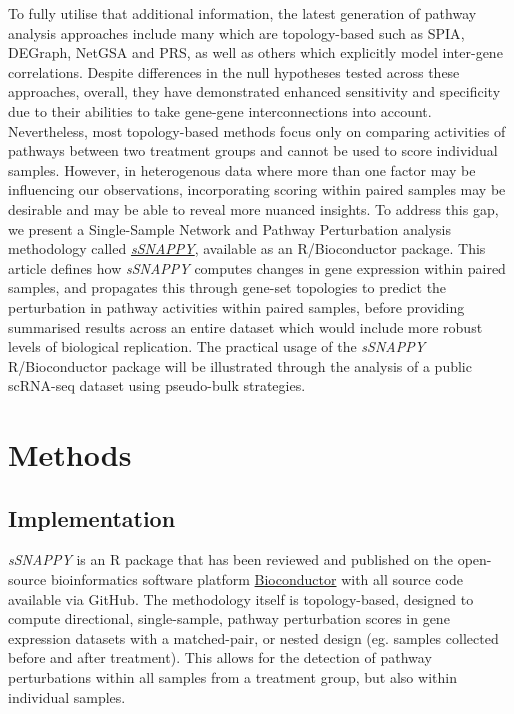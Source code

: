 \documentclass[9pt,a4paper,]{extarticle}
\begin{document}
To fully utilise that additional information, the latest generation of pathway analysis approaches include many which are topology-based such as SPIA\citep{Tarca2009-nf}, DEGraph\citep{Jacob2012}, NetGSA\citep{Ma2016} and PRS\citep{Ibrahim2012}, as well as others which explicitly model inter-gene correlations\citep{Wu2012}.
Despite differences in the null hypotheses tested across these approaches, overall, they have demonstrated enhanced sensitivity and specificity due to their abilities to take gene-gene interconnections into account\citep{Nguyen2019-va, Ma2019}.
Nevertheless, most topology-based methods focus only on comparing activities of pathways between two treatment groups and cannot be used to score individual samples.
However, in heterogenous data where more than one factor may be influencing our observations\citep{Hanzelmann2013}, incorporating scoring within paired samples may be desirable and may be able to reveal more nuanced insights.
To address this gap, we present a Single-Sample Network and Pathway Perturbation analysis methodology called \href{https://bioconductor.org/packages/sSNAPPY}{\emph{sSNAPPY}}, available as an R/Bioconductor package.
This article defines how \emph{sSNAPPY} computes changes in gene expression within paired samples, and propagates this through gene-set topologies to predict the perturbation in pathway activities within paired samples, before providing summarised results across an entire dataset which would include more robust levels of biological replication.
The practical usage of the \emph{sSNAPPY} R/Bioconductor package will be illustrated through the analysis of a public scRNA-seq dataset using pseudo-bulk strategies.

\hypertarget{methods}{%
\section{Methods}\label{methods}}

\hypertarget{implementation}{%
\subsection{Implementation}\label{implementation}}

\emph{sSNAPPY} is an R package that has been reviewed and published on the open-source bioinformatics software platform \href{https://bioconductor.org/packages/release/bioc/html/*sSNAPPY*.html}{Bioconductor} with all source code available via GitHub.
The methodology itself is topology-based, designed to compute directional, single-sample, pathway perturbation scores in gene expression datasets with a matched-pair, or nested design (eg. samples collected before and after treatment).
This allows for the detection of pathway perturbations within all samples from a treatment group, but also within individual samples.
\end{document}
